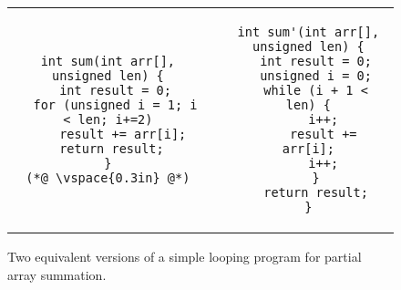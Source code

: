 \begin{figure}
\centering
\begin{tabular}{ccc}
\begin{lstlisting}
int sum(int arr[], unsigned len) {
  int result = 0;
  for (unsigned i = 1; i < len; i+=2)
    result += arr[i];
 return result;
}
(*@ \vspace{0.3in} @*)
\end{lstlisting}
&
\hspace{0.35in}
&
\begin{lstlisting}
int sum'(int arr[], unsigned len) {
  int result = 0;
  unsigned i = 0;
  while (i + 1 < len) {
    i++;
    result += arr[i];
    i++;
  }
  return result;
}
\end{lstlisting}
\end{tabular}
\caption{Two equivalent versions of a simple looping program for partial array summation.}
\end{figure} 